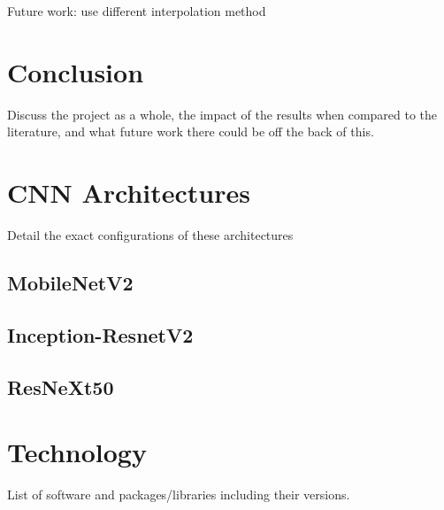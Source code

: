 \documentclass[12pt]{article}
\numberwithin{equation}{section}
\numberwithin{figure}{section}
\begin{document}
Future work:
use different interpolation method

\section{Conclusion} 
\label{sec:Conclusion} 
Discuss the project as a whole, the impact of the results when compared to the literature, and what future work there could be off the back of this.




 

\appendix

\section{CNN Architectures} 
\label{sec:CNN_Architectures} 
Detail the exact configurations of these architectures
\subsection{MobileNetV2} 
\label{sub:MobileNetV2} 
 
\subsection{Inception-ResnetV2} 
\label{sub:Inception-ResnetV2} 
 
\subsection{ResNeXt50} 
\label{sub:ResNeXt50} 
 

\section{Technology} 
\label{sec:Technology} 
List of software and packages/libraries including their versions.
\end{document}

